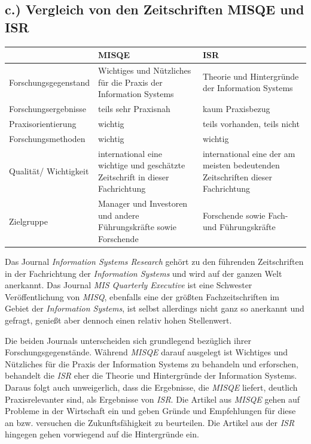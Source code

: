 \documentclass[12pt,utf8]{scrartcl}
\begin{document}
\begin{flushleft}
\subsection{\label{sub3:einfuehrung}c.) Vergleich von den Zeitschriften MISQE und ISR}

\begin{tabular}{|p{4cm}|p{5.5cm}|p{5.5cm}|}
\hline
& MISQE & ISR \\
\hline
Forschungsgegenstand & Wichtiges und Nützliches für die Praxis der Information Systems & Theorie und Hintergründe der Information Systems \\
\hline
Forschungsergebnisse & teils sehr Praxisnah & kaum Praxisbezug \\
\hline
Praxisorientierung & wichtig & teils vorhanden, teils nicht \\
\hline
Forschungsmethoden & wichtig & wichtig \\
\hline
Qualität/ Wichtigkeit & international eine wichtige und geschätzte Zeitschrift in dieser Fachrichtung & international eine der am meisten bedeutenden Zeitschriften dieser Fachrichtung \\
\hline
Zielgruppe & Manager und Investoren und andere Führungskräfte sowie Forschende & Forschende sowie Fach- und Führungskräfte \\
\hline
\end{tabular}
\newline
\newline
\newline

Das Journal \emph{Information Systems Research} gehört zu den führenden Zeitschriften in der Fachrichtung der \emph{Information Systems} und wird auf der ganzen Welt anerkannt. Das Journal \emph{MIS Quarterly Executive} ist eine Schwester Veröffentlichung von \emph{MISQ}\citep{MISQE}, ebenfalls eine der größten Fachzeitschriften im Gebiet der \emph{Information Systems}, ist selbst allerdings nicht ganz so anerkannt und gefragt, genießt aber dennoch einen relativ hohen Stellenwert.

Die beiden Journals unterscheiden sich grundlegend bezüglich ihrer Forschungsgegenstände. Während \emph{MISQE} darauf ausgelegt ist Wichtiges und Nützliches für die Praxis der Information Systems zu behandeln und erforschen\citep{MISQE}, behandelt die \emph{ISR} eher die Theorie und Hintergründe der Information Systems\citep{ISR}. Daraus folgt auch unweigerlich, dass die Ergebnisse, die \emph{MISQE} liefert, deutlich Praxisrelevanter sind, als Ergebnisse von \emph{ISR}. Die Artikel aus \emph{MISQE} gehen auf Probleme in der Wirtschaft ein und geben Gründe und Empfehlungen für diese an bzw. versuchen die Zukunftsfähigkeit zu beurteilen\citep{Chasin2017}\cite{Lacity2017}. Die Artikel aus der \emph{ISR} hingegen gehen vorwiegend auf die Hintergründe ein\cite{Karhu2018}\cite{Constantinides2018}.


\end{flushleft}
\end{document}
